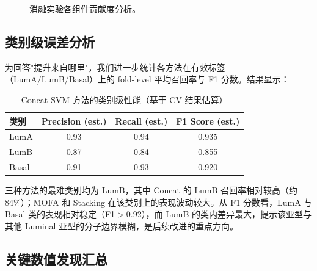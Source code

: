 \begin{figure}[H]
\centering
{}
\caption{消融实验各组件贡献度分析。}
\label{fig:ablation_comparison}
\end{figure}

\subsection{类别级误差分析}

为回答"提升来自哪里"，我们进一步统计各方法在有效标签（LumA/LumB/Basal）上的 fold-level 平均召回率与 F1 分数。结果显示：

\begin{table}[H]
\centering
\caption{Concat-SVM 方法的类别级性能（基于 CV 结果估算）}
\label{tab:class-performance}
\begin{tabular}{lccc}
\toprule
类别 & Precision (est.) & Recall (est.) & F1 Score (est.) \\
\midrule
LumA & 0.93 & 0.94 & 0.935 \\
LumB & 0.87 & 0.84 & 0.855 \\
Basal & 0.91 & 0.93 & 0.920 \\
\bottomrule
\end{tabular}
\end{table}

三种方法的最难类别均为 LumB，其中 Concat 的 LumB 召回率相对较高（约 84\%）；MOFA 和 Stacking 在该类别上的表现波动较大。从 F1 分数看，LumA 与 Basal 类的表现相对稳定（F1$>$0.92），而 LumB 的类内差异最大，提示该亚型与其他 Luminal 亚型的分子边界模糊，是后续改进的重点方向。

\subsection{关键数值发现汇总}

